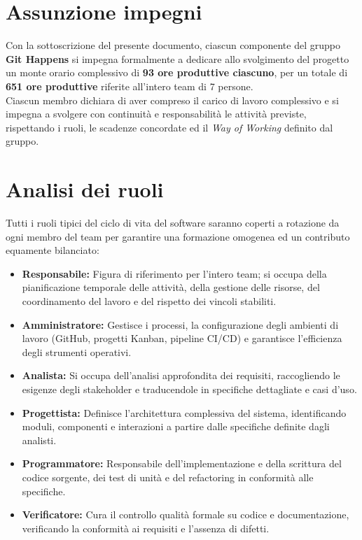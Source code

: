 \section {Assunzione impegni}
Con la sottoscrizione del presente documento, ciascun componente del gruppo \textbf{Git Happens} si impegna formalmente a dedicare allo svolgimento del progetto un monte orario complessivo di \textbf{93 ore produttive ciascuno}, per un totale di \textbf{651 ore produttive} riferite all'intero team di 7 persone.
\\
Ciascun membro dichiara di aver compreso il carico di lavoro complessivo e si impegna a svolgere con continuità e responsabilità le attività previste, rispettando i ruoli, le scadenze concordate ed il \textit{Way of Working} definito dal gruppo.

\section{Analisi dei ruoli}
Tutti i ruoli tipici del ciclo di vita del software saranno coperti a rotazione da ogni membro del team per garantire una formazione omogenea ed un contributo equamente bilanciato:
\begin{itemize}
    \item \textbf{Responsabile:} Figura di riferimento per l'intero team; si occupa della pianificazione temporale delle attività, della gestione delle risorse, del coordinamento del lavoro e del rispetto dei vincoli stabiliti.
    \item \textbf{Amministratore:} Gestisce i processi, la configurazione degli ambienti di lavoro (GitHub, progetti Kanban, pipeline CI/CD) e garantisce l'efficienza degli strumenti operativi.
    \item \textbf{Analista:} Si occupa dell'analisi approfondita dei requisiti, raccogliendo le esigenze degli stakeholder e traducendole in specifiche dettagliate e casi d'uso.
    \item \textbf{Progettista:} Definisce l'architettura complessiva del sistema, identificando moduli, componenti e interazioni a partire dalle specifiche definite dagli analisti.
    \item \textbf{Programmatore:} Responsabile dell'implementazione e della scrittura del codice sorgente, dei test di unità e del refactoring in conformità alle specifiche.
    \item \textbf{Verificatore:} Cura il controllo qualità formale su codice e documentazione, verificando la conformità ai requisiti e l'assenza di difetti.
\end{itemize}